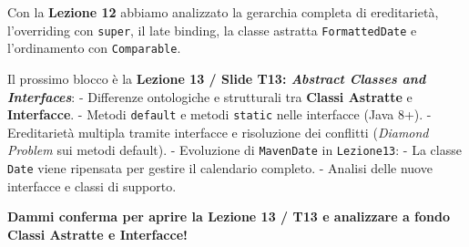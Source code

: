 \documentclass[11pt,a4paper]{article}
\newcommand{\passthrough}[1]{#1}
\begin{document}
\begin{studynote} Con la \textbf{Lezione 12} abbiamo analizzato la gerarchia
completa di ereditarietà, l'overriding con
\passthrough{\lstinline!super!}, il late binding, la classe astratta
\passthrough{\lstinline!FormattedDate!} e l'ordinamento con
\passthrough{\lstinline!Comparable!}.

Il prossimo blocco è la \textbf{Lezione 13 / Slide T13: \emph{Abstract
Classes and Interfaces}}: - Differenze ontologiche e strutturali tra
\textbf{Classi Astratte} e \textbf{Interfacce}. - Metodi
\passthrough{\lstinline!default!} e metodi
\passthrough{\lstinline!static!} nelle interfacce (Java 8+). -
Ereditarietà multipla tramite interfacce e risoluzione dei conflitti
(\emph{Diamond Problem} sui metodi default). - Evoluzione di
\passthrough{\lstinline!MavenDate!} in
\passthrough{\lstinline!Lezione13!}: - La classe
\passthrough{\lstinline!Date!} viene ripensata per gestire il calendario
completo. - Analisi delle nuove interfacce e classi di supporto.
\end{studynote}

\textbf{Dammi conferma per aprire la Lezione 13 / T13 e analizzare a
fondo Classi Astratte e Interfacce!}
\end{document}
